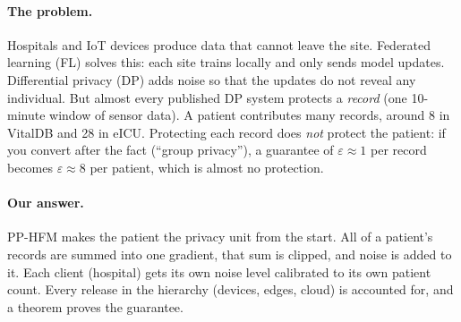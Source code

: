 \documentclass[11pt,a4paper]{article}
\begin{document}
\paragraph{The problem.} Hospitals and IoT devices produce data that cannot leave
the site. Federated learning (FL) solves this: each site trains locally and only
sends model updates. Differential privacy (DP) adds noise so that the updates do
not reveal any individual. But almost every published DP system protects a
\emph{record} (one 10-minute window of sensor data). A patient contributes many
records, around 8 in VitalDB and 28 in eICU. Protecting each record does
\emph{not} protect the patient: if you convert after the fact (``group
privacy''), a guarantee of $\varepsilon \approx 1$ per record becomes
$\varepsilon \approx 8$ per patient, which is almost no protection.

\paragraph{Our answer.} PP-HFM makes the patient the privacy unit from the start.
All of a patient's records are summed into one gradient, that sum is clipped,
and noise is added to it. Each client (hospital) gets its own noise level
calibrated to its own patient count. Every release in the hierarchy (devices,
edges, cloud) is accounted for, and a theorem proves the guarantee.
\end{document}
